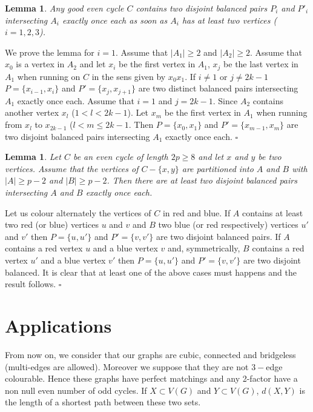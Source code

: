 \documentclass{elsart}
\theoremstyle{plain} \theoremheaderfont{\scshape}
\newtheorem{Lem}[Thm]{\bf Lemma}
\newenvironment{Prf}{{\bf \noindent Proof } }{\hfill$\square$\\}
\begin{document}
\begin{Lem}\label{Lemma:DisjointBalancedPairs}  Any good even cycle $C$
contains two disjoint balanced pairs $P_i$ and $P'_i$ intersecting
$A_i$  exactly once each as soon as $A_i$ has at least two vertices
($i=1,2,3$).
\end{Lem}
\begin{Prf}
We prove the lemma for $i=1$. Assume that $|A_1| \geq 2$ and $|A_2|
\geq 2$. Assume that $x_0$ is a vertex in $A_2$ and let $x_i$ be the
first vertex in $A_1$, $x_j$ be the last vertex in $A_1$ when
running on $C$  in the sens given by $x_0x_1$. If $i \not = 1$ or $j
\not = 2k-1$ $P=\{x_{i-1},x_i\}$ and $P'=\{x_j,x_{j+1}\}$ are two
distinct balanced pairs intersecting $A_1$ exactly once each. Assume
that $i=1$ and $j=2k-1$. Since $A_2$ contains another vertex $x_l$
($1 < l <2k-1$). Let $x_m$ be the first vertex in $A_1$ when running
from $x_l$ to $x_{2k-1}$ ($l <m \leq 2k-1$. Then $P=\{x_0,x_1\}$ and
$P'=\{x_{m-1},x_m\}$ are two disjoint balanced pairs intersecting
$A_1$ exactly once each.
\end{Prf}

\begin{Lem}\label{Lemma:DisjointBalancedPairsSpecialEvenCycle}  Let
$C$ be an even cycle of length $2p \geq 8$ and let $x$ and $y$ be
two vertices. Assume that the vertices of $C-\{x,y\}$ are
partitioned into $A$ and $B$ with $|A| \geq p-2$ and $|B| \geq p-2$.
Then there are at least two disjoint balanced pairs intersecting $A$
and $B$ exactly once each.
\end{Lem}
\begin{Prf}
Let us colour alternately the vertices of $C$ in red and blue. If
$A$ contains at least two red (or blue) vertices $u$ and $v$ and $B$
two blue (or red respectively) vertices $u'$ and $v'$ then
$P=\{u,u'\}$ and $P'=\{v,v'\}$ are two disjoint balanced pairs. If
$A$ contains a red vertex $u$ and a blue vertex $v$ and,
symmetrically, $B$ contains a red vertex $u'$ and a blue vertex $v'$
then $P=\{u,u'\}$ and $P'=\{v,v'\}$ are two disjoint balanced. It is
clear that at least one of the above cases must happens and the
result follows.
\end{Prf}


\section{Applications}

From now on, we consider that our graphs are cubic, connected and
bridgeless (multi-edges are allowed). Moreover we suppose that they
are not $3-$edge colourable. Hence these graphs have perfect
matchings and any 2-factor have a non null even number of odd
cycles. If $X \subset V(G)$ and $Y \subset V(G)$, $d(X,Y)$ is the
length of a shortest path between these two sets.
\end{document}
